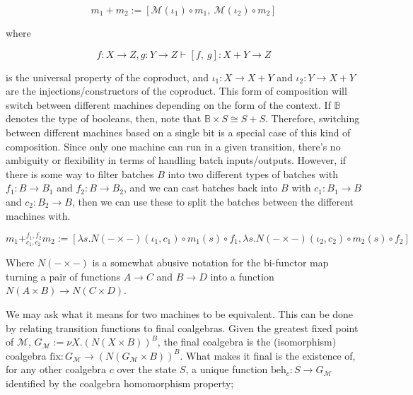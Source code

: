 \begin{equation}
    m_1 + m_2 := [\mathcal{M}(\iota_1) \circ m_1,\ \mathcal{M}(\iota_2) \circ m_2]
\end{equation}

where

\begin{equation}
    f : X \rightarrow Z, g : Y \rightarrow Z \vdash [f,\ g] : X + Y \rightarrow Z
\end{equation}

is the universal property of the coproduct, and $\iota_1 : X \rightarrow X + Y$ and $\iota_2 : Y \rightarrow X + Y$ are the injections/constructors of the coproduct. This form of composition will switch between different machines depending on the form of the context. If $\mathbb{B}$ denotes the type of booleans, then, note that $\mathbb{B} \times S \cong S + S$. Therefore, switching between different machines based on a single bit is a special case of this kind of composition. Since only one machine can run in a given transition, there's no ambiguity or flexibility in terms of handling batch inputs/outputs. However, if there is some way to filter batches $B$ into two different types of batches with $f_1 : B \rightarrow B_1$ and $f_2 : B \rightarrow B_2$, and we can cast batches back into $B$ with $c_1 : B_1 \rightarrow B$ and $c_2 : B_2 \rightarrow B$, then we can use these to split the batches between the different machines with.

\begin{equation}
    m_1 +^{f_1, f_2}_{c_1, c_2} m_2 := [\lambda s. N(- \times -)(\iota_1, c_1) \circ m_1(s) \circ f_1
    , \lambda s. N(- \times -)(\iota_2, c_2) \circ m_2(s) \circ f_2]
\end{equation}

Where $N(- \times -)$ is a somewhat abusive notation for the bi-functor map turning a pair of functions $A \rightarrow C$ and $B \rightarrow D$ into a function $N(A \times B) \rightarrow N(C \times D)$.

We may ask what it means for two machines to be equivalent. This can be done by relating transition functions to final coalgebras. Given the greatest fixed point of $\mathcal{M}$, $G_\mathcal{M} := \nu X. (N(X \times B))^B$, the final coalgebra is the (isomorphism) coalgebra $\text{fix} : G_\mathcal{M} \rightarrow (N(G_\mathcal{M} \times B))^B$. What makes it final is the existence of, for any other coalgebra $c$ over the state $S$, a unique function $\text{beh}_c : S \rightarrow G_\mathcal{M}$ identified by the coalgebra homomorphism property;

